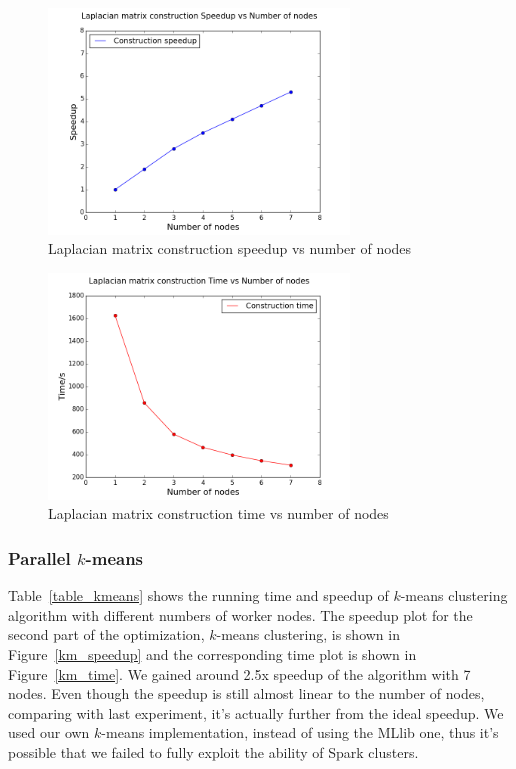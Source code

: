 \documentclass{acm_proc_article-sp}
\begin{document}
\begin{figure}[ht]
\centering
\includegraphics[height=6cm]{ms.png}
\caption{Laplacian matrix construction speedup vs number of nodes}
\label{lm_speedup}
\end{figure}

\begin{figure}[ht]
\centering
\includegraphics[height=6cm]{mt.png}
\caption{Laplacian matrix construction time vs number of nodes}
\label{lm_time}
\end{figure}

\subsubsection{Parallel $k$-means}
Table~\ref{table_kmeans} shows the running time and speedup of $k$-means clustering algorithm with different numbers of worker nodes. The speedup plot for the second part of the optimization, $k$-means clustering, is shown in Figure~\ref{km_speedup} and the corresponding time plot is shown in Figure~\ref{km_time}. We gained around 2.5x speedup of the algorithm with 7 nodes. Even though the speedup is still almost linear to the number of nodes, comparing with last experiment, it's actually further from the ideal speedup. We used our own $k$-means implementation, instead of using the MLlib one, thus it's possible that we failed to fully exploit the ability of Spark clusters.
\end{document}

